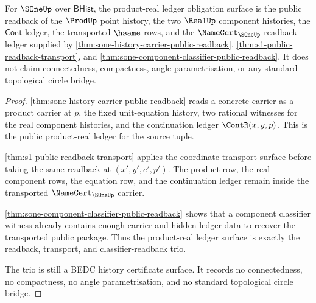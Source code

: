 \begin{theorem}
\label{thm:s1-product-real-ledger-obligation-surface}
For $\SOneUp$ over $\mathsf{BHist}$, the product-real ledger obligation surface
is the public readback of the $\ProdUp$ point history, the two $\RealUp$
component histories, the $\mathsf{Cont}$ ledger, the transported $\hsame$
rows, and the $\NameCert_{\SOneUp}$ readback ledger supplied by
\autoref{thm:sone-history-carrier-public-readback},
\autoref{thm:s1-public-readback-transport}, and
\autoref{thm:sone-component-classifier-public-readback}. It does not claim
connectedness, compactness, angle parametrisation, or any standard topological
circle bridge.
\end{theorem}
\begin{proof}
\autoref{thm:sone-history-carrier-public-readback} reads a concrete carrier as
a product carrier at $p$, the fixed unit-equation history, two rational
witnesses for the real component histories, and the continuation ledger
$\ContR(x,y,p)$. This is the public product-real ledger for the source tuple.

\autoref{thm:s1-public-readback-transport} applies the coordinate transport
surface before taking the same readback at $(x',y',e',p')$. The product row,
the real component rows, the equation row, and the continuation ledger remain
inside the transported $\NameCert_{\SOneUp}$ carrier.

\autoref{thm:sone-component-classifier-public-readback} shows that a component
classifier witness already contains enough carrier and hidden-ledger data to
recover the transported public package. Thus the product-real ledger surface
is exactly the readback, transport, and classifier-readback trio.

The trio is still a BEDC history certificate surface. It records no
connectedness, no compactness, no angle parametrisation, and no standard
topological circle bridge.
\end{proof}

